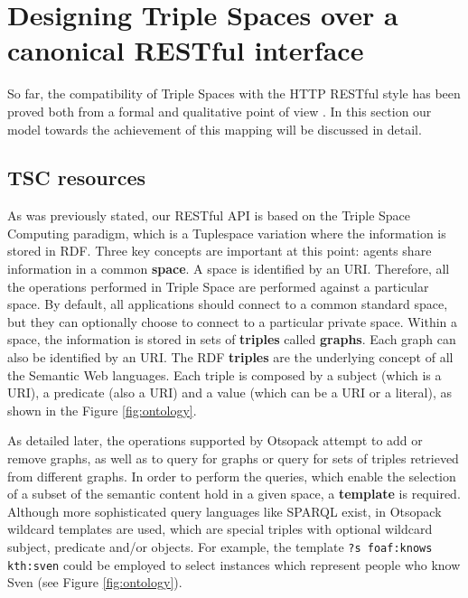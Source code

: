 \section{Designing Triple Spaces over a canonical RESTful interface}

So far, the compatibility of Triple Spaces with the HTTP RESTful style has been proved both from a formal \citep{hernandez_formal_2010} and qualitative point of view \citep{gomez-goiri_complementarity_2011}.
In this section our model towards the achievement of this mapping will be discussed in detail.

\subsection{TSC resources}

As was previously stated, our RESTful API is based on the Triple Space Computing paradigm, which is a Tuplespace variation where the information is stored in RDF.
Three key concepts are important at this point: agents share information in a common \textbf{space}.
A space is identified by an URI.
Therefore, all the operations performed in Triple Space are performed against a particular space.
By default, all applications should connect to a common standard space, but they can optionally choose to connect to a particular private space.
Within a space, the information is stored in sets of \textbf{triples} called \textbf{graphs}.
Each graph can also be identified by an URI. The RDF \textbf{triples} are the underlying concept of all the Semantic Web languages.
Each triple is composed by a subject (which is a URI), a predicate (also a URI) and a value (which can be a URI or a literal), as shown in the Figure \ref{fig:ontology}.

As detailed later, the operations supported by Otsopack attempt to add or remove graphs, as well as to query for graphs or query for sets of triples retrieved from different graphs.
In order to perform the queries, which enable the selection of a subset of the semantic content hold in a given space, a \textbf{template} is required.
Although more sophisticated query languages like SPARQL exist, in Otsopack wildcard templates are used, which are special triples with optional wildcard subject, predicate and/or objects.
For example, the template \texttt{?s foaf:knows kth:sven} could be employed to select instances which represent people who know Sven (see Figure \ref{fig:ontology}).


